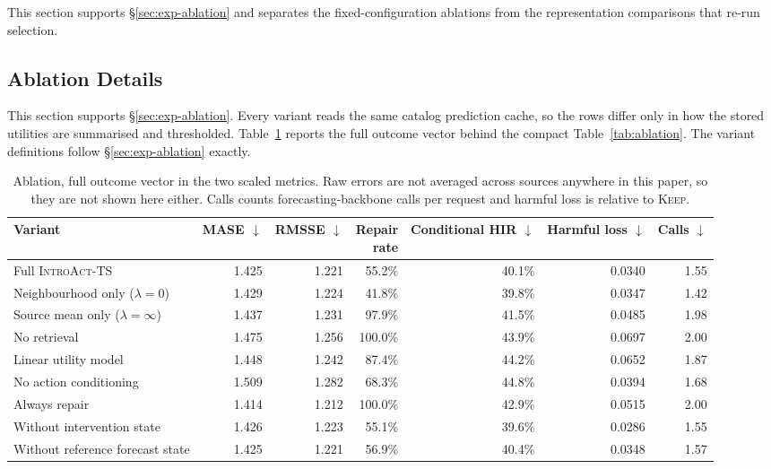 \documentclass{article}
\newcommand{\introact}{\textsc{IntroAct-TS}}
\newcommand{\loss}{\ell}
\begin{document}
This section supports \S\ref{sec:exp-ablation} and separates the fixed-configuration
ablations from the representation comparisons that re-run selection.

\subsection{Ablation Details}
\label{app:ablation-details}
This section supports \S\ref{sec:exp-ablation}. Every variant reads the same catalog
prediction cache, so the rows differ only in how the stored utilities are summarised and
thresholded. Table~\ref{tab:app-ablation} reports the full outcome vector behind the compact
Table~\ref{tab:ablation}. The variant definitions follow \S\ref{sec:exp-ablation} exactly.

\begin{table}[!t]
  \caption{Ablation, full outcome vector in the two scaled metrics. Raw errors are not
  averaged across sources anywhere in this paper, so they are not shown here either. Calls
  counts forecasting-backbone calls per request and harmful loss is relative to
  \textsc{Keep}.}
  \label{tab:app-ablation}
  \centering
  \small
  \setlength{\tabcolsep}{4pt}
\begin{tabularx}{\textwidth}{@{}Xrrrrrr@{}}
    \toprule
    Variant & MASE $\downarrow$ & RMSSE $\downarrow$ & \shortstack[r]{Repair\\rate} & \shortstack[r]{Conditional\\HIR $\downarrow$} & \shortstack[r]{Harmful\\loss $\downarrow$} & Calls $\downarrow$ \\
    \midrule
    Full \introact{} & 1.425 & 1.221 & 55.2\% & 40.1\% & 0.0340 & 1.55 \\
    Neighbourhood only ($\lambda=0$) & 1.429 & 1.224 & 41.8\% & 39.8\% & 0.0347 & 1.42 \\
    Source mean only ($\lambda=\infty$) & 1.437 & 1.231 & 97.9\% & 41.5\% & 0.0485 & 1.98 \\
    No retrieval & 1.475 & 1.256 & 100.0\% & 43.9\% & 0.0697 & 2.00 \\
    Linear utility model & 1.448 & 1.242 & 87.4\% & 44.2\% & 0.0652 & 1.87 \\
    No action conditioning & 1.509 & 1.282 & 68.3\% & 44.8\% & 0.0394 & 1.68 \\
    Always repair & 1.414 & 1.212 & 100.0\% & 42.9\% & 0.0515 & 2.00 \\
    Without intervention state & 1.426 & 1.223 & 55.1\% & 39.6\% & 0.0286 & 1.55 \\
    Without reference forecast state & 1.425 & 1.221 & 56.9\% & 40.4\% & 0.0348 & 1.57 \\
    \midrule
    \bottomrule
  \end{tabularx}
\end{table}
\end{document}

